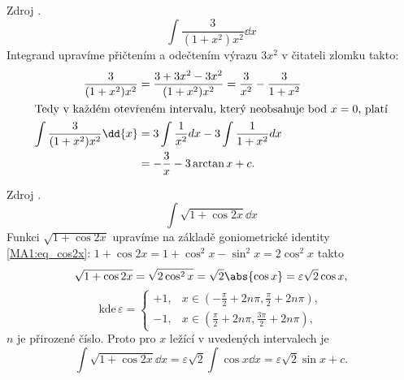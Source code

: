       
      
      \begin{example}
        Zdroj \cite[s.~29]{Knichal}.
        \begin{equation}\label{MA:int_ex_02}
          \int\frac{3}{(1+x^2)x^2}\dd{x}
        \end{equation}
        Integrand upravíme přičtením a odečtením výrazu $3x^2$ v čitateli zlomku takto:
        \begin{align*}
          \frac{3}{(1+x^2)x^2} 
            &= \frac{3+3x^2-3x^2}{(1+x^2)x^2} = \frac{3}{x^2}-\frac{3}{1+x^2}                      \\  
          \intertext{Tedy v každém otevřeném intervalu, který neobsahuje bod \(x=0\), platí}
          \int{\frac{3}{(1+x^2)x^2}\dd{x}} 
            &= 3\int{\frac{1}{x^2}dx} - 3\int{\frac{1}{1+x^2}dx}                                   \\
            &= -\frac{3}{x}-3\arctan x + c. 
        \end{align*}
      \end{example}
      
      \begin{example}
        Zdroj \cite[s.~30]{Knichal}.
        \begin{equation}\label{MA:int_ex_04}
          \int{\sqrt{1+\cos2x}\dd{x}}
        \end{equation}
        Funkci $\sqrt{1+\cos2x}$ upravíme na základě goniometrické identity \ref{MA1:eq_cos2x}:
        \(1+\cos2x = 1+\cos^2x-\sin^2x=2\cos^2x\) takto
        \begin{equation*}
          \sqrt{1+\cos2x} =\sqrt{2\cos^2x} = \sqrt{2}\abs{\cos x} = \varepsilon\sqrt{2}\cos x, 
        \end{equation*}
        \begin{equation*}
          \text{kde}\,\varepsilon =
            \begin{cases} 
             +1, &  x\in \left(-\frac{\pi}{2}+2n\pi,\frac{\pi}{2}+2n\pi\right), \\
             -1, &  x\in \left(\frac{\pi}{2}+2n\pi,\frac{3\pi}{2}+2n\pi\right),
            \end{cases}
        \end{equation*}
        $n$ je přirozené číslo. Proto pro $x$ ležící v uvedených intervalech je
        \begin{equation*}
          \int\sqrt{1+\cos2x}\dd{x} = \varepsilon\sqrt{2}\int\cos x\dd{x} 
                                 = \varepsilon\sqrt{2}\sin x + c.
        \end{equation*}
      \end{example}
      
